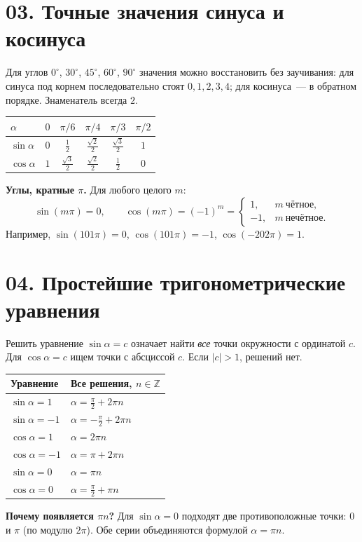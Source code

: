 \documentclass[a4paper,12pt]{article}
\newcommand{\key}[1]{\textcolor{darkaccent}{\textbf{#1}}}
\newcommand{\dd}{^{\circ}}
\begin{document}
\clearpage
\section*{03. Точные значения синуса и косинуса}
Для углов $0\dd$, $30\dd$, $45\dd$, $60\dd$, $90\dd$ значения можно восстановить без заучивания: для синуса под корнем последовательно стоят $0,1,2,3,4$; для косинуса~--- в обратном порядке. Знаменатель всегда $2$.
\begin{center}
\renewcommand{\arraystretch}{1.80}
\begin{tabular}{@{}lccccc@{}}\toprule
$\alpha$ & $0$ & $\pi/6$ & $\pi/4$ & $\pi/3$ & $\pi/2$ \\ \midrule
$\sin\alpha$ & $0$ & $\frac12$ & $\frac{\sqrt2}{2}$ & $\frac{\sqrt3}{2}$ & $1$\\
$\cos\alpha$ & $1$ & $\frac{\sqrt3}{2}$ & $\frac{\sqrt2}{2}$ & $\frac12$ & $0$\\\bottomrule
\end{tabular}
\end{center}
\key{Углы, кратные $\pi$.} Для любого целого $m$:
\[
\sin(m\pi)=0,\qquad
\cos(m\pi)=(-1)^m=\begin{cases}1,&m\ \text{чётное},\\-1,&m\ \text{нечётное}.\end{cases}
\]
Например, $\sin(101\pi)=0$, $\cos(101\pi)=-1$, $\cos(-202\pi)=1$.

\section*{04. Простейшие тригонометрические уравнения}
Решить уравнение $\sin\alpha=c$ означает найти \emph{все} точки окружности с ординатой $c$. Для $\cos\alpha=c$ ищем точки с абсциссой $c$. Если $|c|>1$, решений нет.
\begin{center}
\renewcommand{\arraystretch}{1.42}
\begin{tabularx}{\linewidth}{@{}Xl@{}}\toprule
Уравнение & Все решения, $n\in\mathbb Z$ \\ \midrule
$\sin\alpha=1$ & $\displaystyle\alpha=\frac\pi2+2\pi n$ \\
$\sin\alpha=-1$ & $\displaystyle\alpha=-\frac\pi2+2\pi n$ \\
$\cos\alpha=1$ & $\alpha=2\pi n$ \\
$\cos\alpha=-1$ & $\alpha=\pi+2\pi n$ \\
$\sin\alpha=0$ & $\alpha=\pi n$ \\
$\cos\alpha=0$ & $\displaystyle\alpha=\frac\pi2+\pi n$ \\
\bottomrule\end{tabularx}
\end{center}
\key{Почему появляется $\pi n$?} Для $\sin\alpha=0$ подходят две противоположные точки: $0$ и $\pi$ (по модулю $2\pi$). Обе серии объединяются формулой $\alpha=\pi n$.
\end{document}
